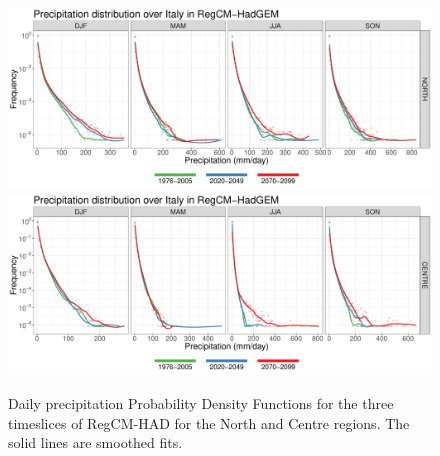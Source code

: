 \afterpage{\clearpage}
\begin{figure}
    \centering
        \includegraphics[width=0.8\textheight]{figures/change_rcm/pr/pdf_NORTH_lines}
        \includegraphics[width=0.8\textheight]{figures/change_rcm/pr/pdf_CENTRE_lines}
    \caption[Projected change of RegCM precipitation PDFs (1)]{
        Daily precipitation Probability Density Functions for the three timeslices of RegCM-HAD for the North and Centre regions. The solid lines are smoothed fits.
    }\label{fig:change_rcm_pr_pdf1}
\end{figure}
\afterpage{\clearpage}
